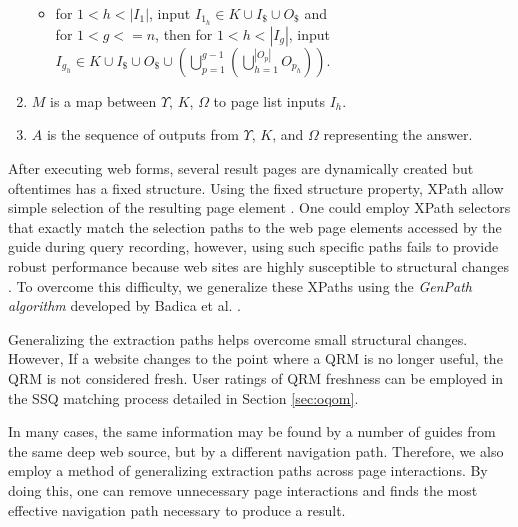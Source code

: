 \begin{enumerate}
\begin{itemize}
\item for $1 < h < \left| I_1 \right|$, input $I_{1_h} \in K \cup
  I_{\$} \cup O_{\$}$ and \\ for $1 < g <= n$, then for $1 < h <
  \left| I_g \right|$, input $I_{g_h} \in K \cup I_{\$} \cup O_{\$}
  \cup \left( \bigcup^{g-1}_{p=1} \left(
  \bigcup^{\left|O_p\right|}_{h=1}O_{p_h} \right)\right)$.
\end{itemize}

\item $M$ is a map between $\Upsilon$, $K$, $\Omega$ to page list inputs $I_h$.

\item $A$ is the sequence of outputs from $\Upsilon$, $K$, and
  $\Omega$ representing the answer.

\end{enumerate}



After executing web forms, several result pages are dynamically created but oftentimes has a fixed structure.
Using the fixed structure property,  XPath allow simple selection of the resulting page element \cite{xpath_leashed}.
One could employ XPath selectors that exactly match the
selection paths to the web page elements accessed by the guide during
query recording, however, using such specific paths fails to provide
robust performance because web sites are highly susceptible to
structural changes \cite{TanZMG07}.  To overcome this difficulty, we
generalize these XPaths using the \emph{GenPath algorithm} developed by
Badica et al. \cite{Badica06}.

Generalizing the extraction paths helps overcome small structural
changes. However, If a website changes to the point where a QRM is no
longer useful, the QRM is not considered fresh. User ratings of QRM
freshness can be employed in the SSQ matching process detailed in
Section \ref{sec:oqom}.

In many cases, the same information may be found by a number of guides
from the same deep web source, but by a different navigation path.
Therefore, we also employ a method of generalizing extraction paths
across page interactions. By doing this, one can remove unnecessary
page interactions and finds the most effective navigation path
necessary to produce a result.
